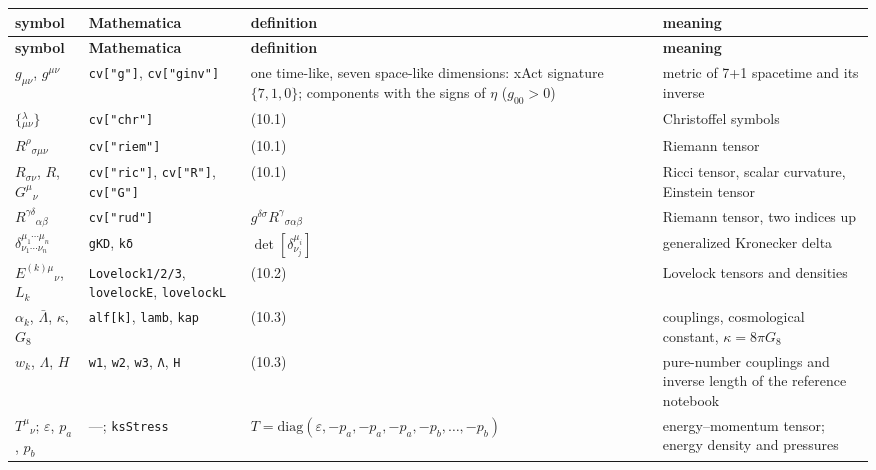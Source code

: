 \documentclass[10pt,a4paper]{article}
\begin{document}
{\footnotesize
\begin{longtable}{>{\raggedright\arraybackslash}p{}>{\raggedright\arraybackslash}p{}>{\raggedright\arraybackslash}p{}>{\raggedright\arraybackslash}p{}}
\toprule
\textbf{symbol} & \textbf{Mathematica} & \textbf{definition} & \textbf{meaning} \\
\midrule\endfirsthead
\toprule
\textbf{symbol} & \textbf{Mathematica} & \textbf{definition} & \textbf{meaning} \\
\midrule\endhead
\endfoot
\bottomrule\endlastfoot
$g_{\mu\nu}$, $g^{\mu\nu}$ & \texttt{cv["g"]}, \texttt{cv["ginv"]} & one time-like, seven space-like dimensions: xAct signature $\{7,1,0\}$; components with the signs of $\eta$ ($g_{00}>0$) & metric of 7+1 spacetime and its inverse \\
$\{{}^{\lambda}_{\mu\nu}\}$ & \texttt{cv["chr"]} & (10.1) & Christoffel symbols \\
$R^\rho{}_{\sigma\mu\nu}$ & \texttt{cv["riem"]} & (10.1) & Riemann tensor \\
$R_{\sigma\nu}$, $R$, $G^\mu{}_\nu$ & \texttt{cv["ric"]}, \texttt{cv["R"]}, \texttt{cv["G"]} & (10.1) & Ricci tensor, scalar curvature, Einstein tensor \\
$R^{\gamma\delta}{}_{\alpha\beta}$ & \texttt{cv["rud"]} & $g^{\delta\sigma}R^\gamma{}_{\sigma\alpha\beta}$ & Riemann tensor, two indices up \\
$\delta^{\mu_1\cdots\mu_n}_{\nu_1\cdots\nu_n}$ & \texttt{gKD}, \texttt{kδ} & $\det[\delta^{\mu_i}_{\nu_j}]$ & generalized Kronecker delta \\
$E^{(k)\mu}{}_\nu$, $L_k$ & \texttt{Lovelock1/\allowbreak{}2/\allowbreak{}3}, \texttt{lovelockE}, \texttt{lovelockL} & (10.2) & Lovelock tensors and densities \\
$\alpha_k$, $\bar\Lambda$, $\kappa$, $G_8$ & \texttt{alf[k]}, \texttt{lamb}, \texttt{kap} & (10.3) & couplings, cosmological constant, $\kappa=8\pi G_8$ \\
$w_k$, $\Lambda$, $H$ & \texttt{w1}, \texttt{w2}, \texttt{w3}, \texttt{Λ}, \texttt{H} & (10.3) & pure-number couplings and inverse length of the reference notebook \\
$T^\mu{}_\nu$; $\varepsilon$, $p_a$, $p_b$ & —; \texttt{ksStress} & $T=\mathrm{diag}(\varepsilon,-p_a,-p_a,-p_a,-p_b,\dots,-p_b)$ & energy–momentum tensor; energy density and pressures \\

\end{longtable}}
\end{document}
